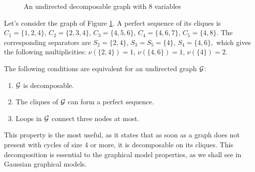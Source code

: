 \begin{figure}[H]
 \begin{center}
 \caption{An undirected decomposable graph with 8 variables}
  \label{ex:graph}
    \end{center}
\end{figure}
 Let's consider the graph of Figure \ref{ex:graph}. A perfect sequence of its cliques is 
$C_1=\{1,2,4\}$, $C_2=\{2,3,4\}$, $C_3=\{4,5,6\}$, $C_4=\{4,6,7\}$, $C_5=\{4,8\}$. The corresponding separators are $S_2=\{2,4\}$, $S_3=S_5=\{4\}$, $S_4=\{4,6\},$ which gives the following multiplicities: $\nu(\{2,4\})=1$,  $\nu(\{4,6\})=1$, $\nu(\{4\})=2$.  


\begin{prop}
\label{decomp}
The following conditions are equivalent for an undirected graph $\mathcal{G}$:
\begin{enumerate}[label=(\roman*)]
\item $\mathcal{G}$ is decomposable.
\item The cliques of $\mathcal{G}$ can form a perfect sequence.
\item Loops in $\mathcal{G}$ connect three nodes at most.
\end{enumerate}
\end{prop}

 This property is the most useful, as it states that as soon as a graph does not present with cycles of size 4 or more, it is decomposable on its cliques. This decomposition is essential to the graphical model properties, as we shall see in Gaussian graphical models.
 
